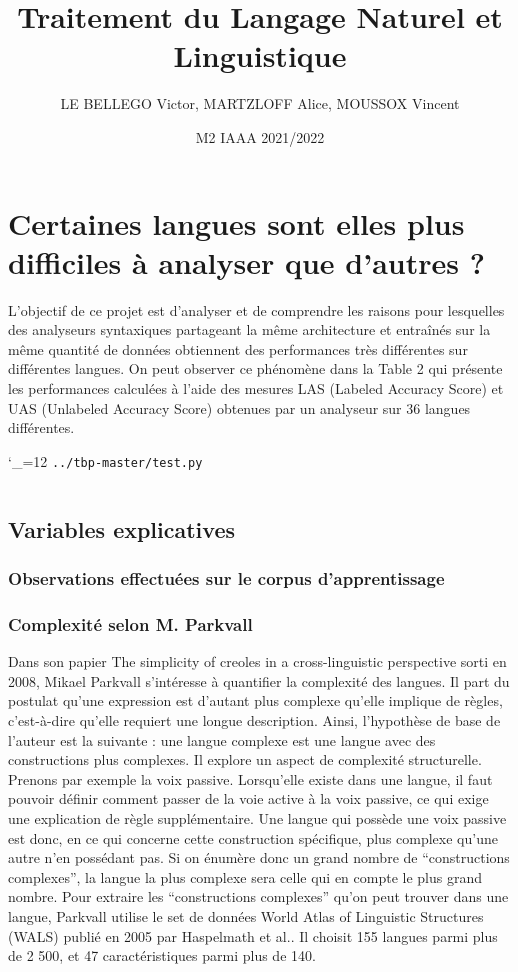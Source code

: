 \documentclass[a4paper, twoside]{article}
\title{Traitement du Langage Naturel et Linguistique}
\date{M2 IAAA 2021/2022}
\author{LE BELLEGO Victor, MARTZLOFF Alice, MOUSSOX Vincent}
\makeatletter
\newcommand{\inputmintedcustom}[1]{\begingroup \catcode`_=12 \texttt{#1} \begin{mdframed}[topline = false, leftline = true, rightline = false, bottomline = false,backgroundcolor=bgLightGray,linewidth=0.5pt]
\inputminted[linenos=true, tabsize=4, fontsize=\small, xleftmargin=0pt, xrightmargin=5pt, breaklines=true, obeytabs=true, numbersep=5mm,]{python}{#1}
\end{mdframed}}
\newenvironment{beware}[1][\@nil]
{	\def\tmp{#1}%
    \setlength{\OuterFrameSep}{0pt}						%
	\setlength{\FrameSep}{1mm}							%
	\definecolor{shadecolor}{rgb}{1.00,0.80,0.80}		%
	\begin{leftbar}\noindent{}%
	\ifx\tmp\@nnil{}\else{\textbf{#1 : }}\fi}           %
{\end{leftbar}\par}
\makeatother
\begin{document}
\maketitle

    \section{Certaines langues sont elles plus difficiles à analyser que d’autres ?}

    L'objectif de ce projet est d'analyser et de comprendre les raisons pour lesquelles des analyseurs syntaxiques partageant la même architecture et entraînés sur la même quantité de données obtiennent des performances très différentes sur différentes langues. On peut observer ce phénomène dans la Table 2 qui présente les performances calculées à l'aide des mesures LAS (Labeled Accuracy Score) et UAS (Unlabeled Accuracy Score) obtenues par un analyseur sur 36 langues différentes.

    \inputmintedcustom{../tbp-master/test.py}

    \subsection{Variables explicatives}

    \subsubsection{Observations effectuées sur le corpus d'apprentissage}
    \subsubsection{Complexité selon M. Parkvall}

    Dans son papier The simplicity of creoles in a cross-linguistic perspective sorti en 2008, Mikael Parkvall s’intéresse à quantifier la complexité des langues. Il part du postulat qu’une expression est d’autant plus complexe qu’elle implique de règles, c’est-à-dire qu’elle requiert une longue description. Ainsi, l'hypothèse de base de l’auteur est la suivante : une langue complexe est une langue avec des constructions plus complexes. Il explore un aspect de complexité structurelle.
    Prenons par exemple la voix passive. Lorsqu’elle existe dans une langue, il faut pouvoir définir comment passer de la voie active à la voix passive, ce qui exige une explication de règle supplémentaire. Une langue qui possède une voix passive est donc, en ce qui concerne cette construction spécifique, plus complexe qu’une autre n’en possédant pas. Si on énumère donc un grand nombre de “constructions complexes”, la langue la plus complexe sera celle qui en compte le plus grand nombre.
    Pour extraire les “constructions complexes” qu’on peut trouver dans une langue, Parkvall utilise le set de données World Atlas of Linguistic Structures (WALS) publié en 2005 par Haspelmath et al.. Il choisit 155 langues parmi plus de 2 500, et 47 caractéristiques parmi plus de 140.
\end{document}
